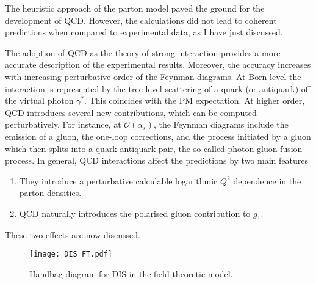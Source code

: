 The heuristic approach of the parton model paved the ground for the development of QCD. However, the calculations did not lead to coherent predictions when compared to experimental data, as I have just discussed.%

The adoption of QCD as the theory of strong interaction provides a more accurate description of the experimental results. Moreover, the accuracy increases with increasing perturbative order of the Feynman diagrams. At Born level the interaction is represented by the tree-level scattering of a quark (or antiquark) off the virtual photon $\gamma^{*}$. This coincides with the PM expectation. At higher order, QCD introduces several new contributions, which can be computed perturbatively. For instance, at $\mathcal{O}(\alpha_{s})$, the Feynman diagrams include the emission of a gluon, the one-loop corrections, and the process initiated by a gluon which then splits into a quark-antiquark pair, the so-called photon-gluon fusion process. In general, QCD interactions affect the predictions by two main features
\begin{enumerate}
  \item They introduce a perturbative calculable logarithmic $Q^2$ dependence in the parton densities.
  \item QCD naturally introduces the polarised gluon contribution to $g_1$.  
\end{enumerate}
These two effects are now discussed.

\begin{figure}[t]
  \centering
  \texttt{[image: DIS\_FT.pdf]} 
  \caption{Handbag diagram for DIS in the field theoretic model.}
  \label{fig:DIS_FT}
\end{figure}


